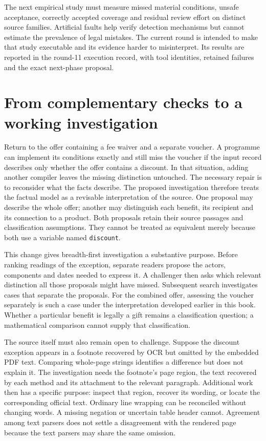 \documentclass[12pt,a4paper,oneside,openany]{book}
\begin{document}
The next empirical study must measure missed material conditions, unsafe
acceptance, correctly accepted coverage and residual review effort on distinct
source families. Artificial faults help verify detection mechanisms but cannot
estimate the prevalence of legal mistakes. The current round is intended to make
that study executable and its evidence harder to misinterpret. Its results are
reported in the round-11 execution record, with tool identities, retained failures
and the exact next-phase proposal.

\section{From complementary checks to a working investigation}
\label{sec:integrated-investigation}

Return to the offer containing a fee waiver and a separate voucher. A programme
can implement its conditions exactly and still miss the voucher if the input
record describes only whether the offer contains a discount. In that situation,
adding another compiler leaves the missing distinction untouched. The necessary
repair is to reconsider what the facts describe. The proposed investigation
therefore treats the factual model as a revisable interpretation of the source.
One proposal may describe the whole offer; another may distinguish each benefit,
its recipient and its connection to a product. Both proposals retain their
source passages and classification assumptions. They cannot be treated as
equivalent merely because both use a variable named \texttt{discount}.

This change gives breadth-first investigation a substantive purpose. Before
ranking readings of the exception, separate readers propose the actors,
components and dates needed to express it. A challenger then asks which relevant
distinction all those proposals might have missed. Subsequent search investigates
cases that separate the proposals. For the combined offer, assessing the voucher
separately is such a case under the interpretation developed earlier in this
book. Whether a particular benefit is legally a gift remains a classification
question; a mathematical comparison cannot supply that classification.

The source itself must also remain open to challenge. Suppose the discount
exception appears in a footnote recovered by OCR but omitted by the embedded
PDF text. Comparing whole-page strings identifies a difference but does not
explain it. The investigation needs the footnote's page region, the text recovered
by each method and its attachment to the relevant paragraph. Additional work
then has a specific purpose: inspect that region, recover its wording, or locate
the corresponding official text. Ordinary line wrapping can be reconciled
without changing words. A missing negation or uncertain table header cannot.
Agreement among text parsers does not settle a disagreement with the rendered
page because the text parsers may share the same omission.
\end{document}
